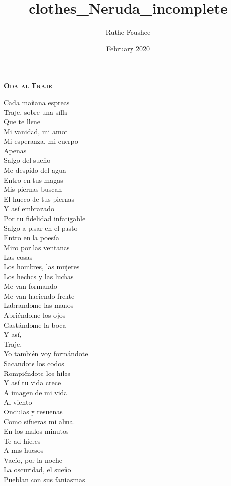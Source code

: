 \documentclass{memoir}
\title{clothes_Neruda_incomplete}
\author{Ruthe Foushee}
\date{February 2020}
\begin{document}
\thispagestyle{empty}
\noindent \textbf{\textsc{\Large Oda al Traje}}
\vspace{18pt}

Cada ma\~{n}ana espreas\\
Traje, sobre una silla\\
Que te llene\\
Mi vanidad, mi amor\\
Mi esperanza, mi cuerpo\\
Apenas\\
Salgo del sueño\\
Me despido del agua\\
Entro en tus magas\\
Mis piernas buscan\\
El hueco de tus piernas\\
Y así embrazado\\
Por tu fidelidad infatigable\\
Salgo a pisar en el pasto\\
Entro en la poesía\\
Miro por las ventanas\\
Las cosas\\
Los hombres, las mujeres\\
Los hechos y las luchas\\
Me van formando\\
Me van haciendo frente\\
Labrandome las manos\\
Abriéndome los ojos\\
Gastándome la boca\\
Y así,\\
Traje,\\
Yo también voy formándote\\
Sacandote los codos\\
Rompiéndote los hilos\\
Y así tu vida crece\\
A imagen de mi vida\\
Al viento\\
Ondulas y resuenas\\
Como sifueras mi alma.\\
En los malos minutos\\
Te ad hieres\\
A mis huesos\\
Vacío, por la noche\\
La oscuridad, el sueño\\
Pueblan con sus fantasmas\\
\end{document}
